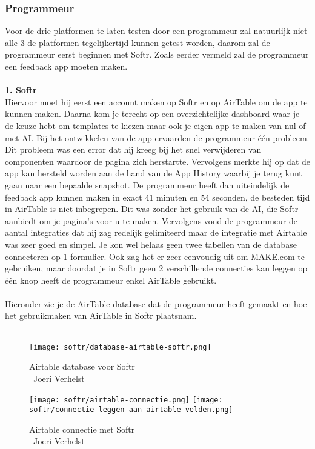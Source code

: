 \subsubsection{Programmeur}%
\label{subsubsec:programmeur}
Voor de drie platformen te laten testen door een programmeur zal natuurlijk niet alle 3 de platformen tegelijkertijd 
kunnen getest worden, daarom zal de programmeur eerst beginnen met Softr. 
Zoals eerder vermeld zal de programmeur een feedback app moeten maken.
\\
\\
\textbf{1. Softr}
\\
Hiervoor moet hij eerst een account maken op Softr en op AirTable om de app te kunnen maken. 
Daarna kom je terecht op een overzichtelijke dashboard waar je de keuze hebt om templates te kiezen maar 
ook je eigen app te maken van nul of met AI. Bij het ontwikkelen van de app ervaarden de programmeur één probleem. 
Dit probleem was een error dat hij kreeg bij het snel verwijderen van componenten waardoor de pagina zich herstartte. 
Vervolgens merkte hij op dat de app kan hersteld worden aan de hand van de App History waarbij je terug kunt gaan 
naar een bepaalde snapshot. De programmeur heeft dan uiteindelijk de feedback app 
kunnen maken in exact 41 minuten en 54 seconden, de besteden tijd in AirTable is niet inbegrepen. 
Dit was zonder het gebruik van de AI, die Softr aanbiedt om je pagina’s voor u te maken. Vervolgens vond 
de programmeur de aantal integraties dat hij zag redelijk gelimiteerd maar de integratie met Airtable was 
zeer goed en simpel. Je kon wel helaas geen twee tabellen van de database connecteren op 1 formulier. 
Ook zag het er zeer eenvoudig uit om MAKE.com te gebruiken, maar doordat je in Softr geen 2 verschillende connecties 
kan leggen op één knop heeft de programmeur enkel AirTable gebruikt.
\\
\\
Hieronder zie je de AirTable database dat de programmeur heeft gemaakt en hoe het gebruikmaken van AirTable in Softr plaatsnam.
\\
\\
\begin{figure}[H]
    \texttt{[image: softr/database-airtable-softr.png]}
    \caption[Airtable database voor Softr]{Airtable database voor Softr\\\textcopyright\ Joeri Verhelst}
    \label{fig:database-airtable-softr}
\end{figure}
\begin{figure}[H]
    \texttt{[image: softr/airtable-connectie.png]}
    \texttt{[image: softr/connectie-leggen-aan-airtable-velden.png]}
    \caption[Airtable connectie met Softr]{Airtable connectie met Softr\\\textcopyright\ Joeri Verhelst}
    \label{fig:database-airtable-softr-connectie}
\end{figure}

